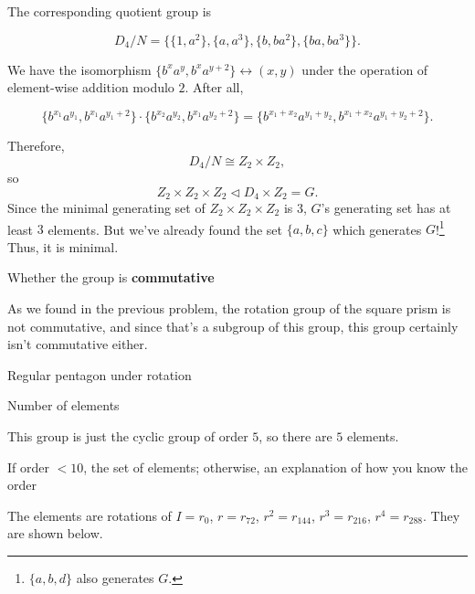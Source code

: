 \documentclass[../key.tex]{subfiles}
\begin{document}
\noindent The corresponding quotient group is

$$D_4/N = \{\{1,a^2\}, \{a,a^3\}, \{b,ba^2\}, \{ba, ba^3\}\}.$$

\noindent We have the isomorphism $\{b^xa^{y},b^xa^{y+2}\}\leftrightarrow (x,y)$ under the operation of element-wise addition modulo $2$. After all,

$$\{b^{x_1}a^{y_1},b^{x_1}a^{y_1+2}\}\cdot \{b^{x_2}a^{y_2},b^{x_1}a^{y_2+2}\} = \{b^{x_1+x_2}a^{y_1+y_2},b^{x_1+x_2}a^{y_1+y_2+2}\}.$$

\noindent Therefore, $$D_4/N \cong Z_2 \times Z_2,$$ so $$Z_2 \times Z_2 \times Z_2 \triangleleft D_4\times Z_2=G.$$ Since the minimal generating set of $Z_2\times Z_2\times Z_2$ is $3$, $G$'s generating set has at least $3$ elements. But we've already found the set $\{a,b,c\}$ which generates $G$!\footnote{$\{a,b,d\}$ also generates $G$.} Thus, it is minimal.

\begin{inner_problem}
\item Whether the group is \textbf{commutative}
\end{inner_problem}

\noindent As we found in the previous problem, the rotation group of the square prism is not commutative, and since that's a subgroup of this group, this group certainly isn't commutative either.

\begin{outer_problem}
\item Regular pentagon under rotation
\end{outer_problem}

\begin{inner_problem}[start=1]
\item Number of elements
\end{inner_problem}

\noindent This group is just the cyclic group of order $5$, so there are $5$ elements.

\begin{inner_problem}
\item If order $< 10$, the set of elements; otherwise, an explanation of how you know the order
\end{inner_problem}

\noindent The elements are rotations of $I=r_0$, $r=r_{72}$, $r^2=r_{144}$, $r^3=r_{216}$, $r^4=r_{288}$. They are shown below.
\end{document}

